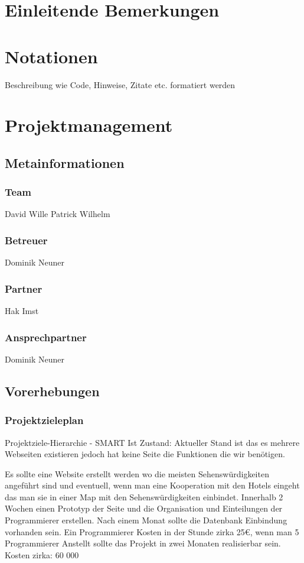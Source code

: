 \def \currentAuthor {Gabi Sorglos} %

\chapter*{Einleitende Bemerkungen}

\chapter*{Notationen}
Beschreibung wie Code, Hinweise, Zitate etc. formatiert werden  

\chapter{Projektmanagement}

\section{Metainformationen}
\subsection{Team}
David Wille Patrick Wilhelm
\subsection{Betreuer}
Dominik Neuner
\subsection{Partner}
Hak Imst
\subsection{Ansprechpartner}
Dominik Neuner
\section{Vorerhebungen}
\subsection{Projektzieleplan}
Projektziele-Hierarchie - SMART
 Ist Zustand:
Aktueller Stand ist das es mehrere Webseiten existieren jedoch hat keine Seite die Funktionen die wir benötigen.



Es sollte eine Website erstellt werden wo die meisten Sehenswürdigkeiten angeführt sind und eventuell, wenn man eine Kooperation mit den Hotels eingeht das man sie in einer Map mit den Sehenswürdigkeiten einbindet.
Innerhalb 2 Wochen einen Prototyp der Seite und die Organisation und Einteilungen der Programmierer erstellen. Nach einem Monat sollte die Datenbank Einbindung vorhanden sein. 
Ein Programmierer Kosten in der Stunde zirka 25€, wenn man 5 Programmierer Anstellt sollte das Projekt in zwei Monaten realisierbar sein.
Kosten zirka: 60 000 


